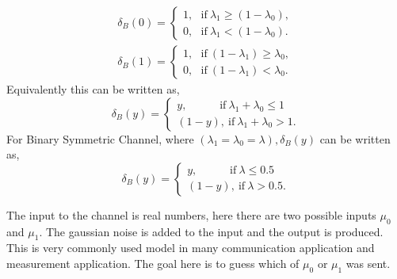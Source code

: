 \documentclass[12pt]{report}
\begin{document}
\begin{itemize}
\begin{exmp}
\begin{eqnarray}
\nonumber
\delta_{B}(0)=
\begin{cases}
1,~~~\mbox{if}~\lambda_1\geq(1-\lambda_0),\\ 
0,~~~\mbox{if}~\lambda_1<(1-\lambda_0).
\end{cases}\\ \nonumber
\delta_{B}(1)=\begin{cases}
1,~~~\mbox{if}~(1-\lambda_1)\geq\lambda_0,\\
0,~~~\mbox{if}~(1-\lambda_1)<\lambda_0.
\end{cases}
\end{eqnarray}
Equivalently this can be written as,
\begin{equation}
\nonumber
\delta_{B}(y)=\begin{cases}
y,\hspace{35pt}\mbox{if}~\lambda_1+\lambda_0\leq1\\
\left( 1-y\right), ~\mbox{if}~\lambda_1+\lambda_0>1.
\end{cases}
\end{equation}
For Binary Symmetric Channel, where $\left(\lambda_1=\lambda_0=\lambda\right),\delta_B(y)$ can be written as,
\begin{equation}
\nonumber
\delta_{B}(y)=\begin{cases}
y,\hspace{35pt}\mbox{if}~\lambda\leq  0.5\\
\left( 1-y\right), ~\mbox{if}~\lambda>0.5.
\end{cases}
\end{equation}
\end{exmp}


\begin{exmp}
The input to the channel is real numbers, here there are two possible inputs $\mu_0$ and $\mu_1$. The gaussian noise is added to the input and the output is produced. This is very commonly used model in many communication application and measurement application. The goal here is to guess which of $\mu_0$ or $\mu_1$ was sent.\\



\end{exmp}
\end{itemize}
\end{document}
